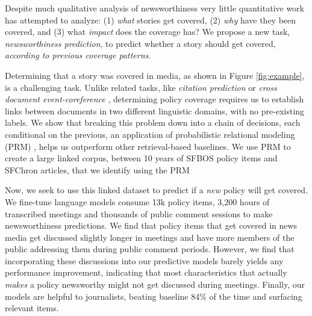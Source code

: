 \documentclass[11pt]{article}
\begin{document}
Despite much qualitative analysis of newsworthiness \cite{gatlung1965structure, kaniss1991making} very little quantitative work has attempted to analyze: (1) \textit{what} stories get covered, (2) \textit{why} have they been covered, and (3) what \textit{impact} does the coverage has? We propose a new task, \textit{newsworthiness prediction}, to predict whether a story should get covered, \textit{according to previous coverage patterns}. 

Determining that a story was covered in media, as shown in Figure \ref{fig:example}, is a challenging task. Unlike related tasks, like \textit{citation prediction} \cite{shibata2012link} or \textit{cross document event-coreference} \cite{bagga1999cross}, determining policy coverage requires us to establish links between documents in two different linguistic domains, with no pre-existing labels. We show that breaking this problem down into a chain of decisions, each conditional on the previous, an application of probabilistic relational modeling (PRM) \cite{getoor2002learning}, helps us outperform other retrieval-based baselines. We use PRM to create a large linked corpus, between 10 years of SFBOS policy items and SFChron articles, that we identify using the PRM


Now, we seek to use this linked dataset to predict if a \textit{new} policy will get covered. We fine-tune language models consume 13k policy items, 3,200 hours of transcribed meetings and thousands of public comment sessions to make newsworthiness predictions. We find that policy items that get covered in news media get discussed slightly longer in meetings and have more members of the public addressing them during public comment periods. However, we find that incorporating these discussions into our predictive models barely yields any performance improvement, indicating that most characteristics that actually \textit{makes} a policy newsworthy might not get discussed during meetings. Finally, our models are helpful to journalists, beating baseline 84\% of the time and surfacing relevant items. 
\end{document}
